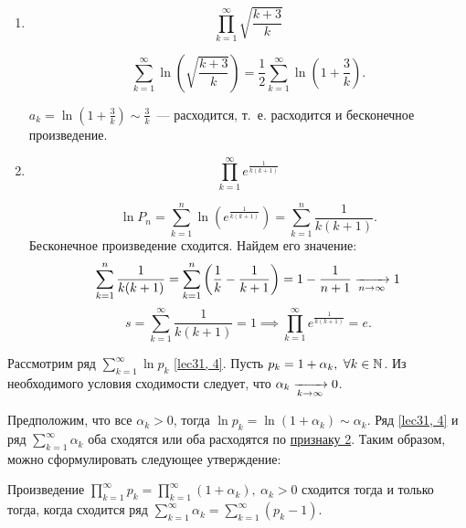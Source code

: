 \documentclass[../../main.tex]{subfiles}
\begin{document}
	\begin{example}
		\begin{enumerate}[label=\arabic*)]
			\item \[\prod\limits_{k = 1}^{\infty} \sqrt{\frac{k + 3}{k}}\]
			
			\[\sum\limits_{k = 1}^{\infty} \ln \left(\sqrt{\frac{k + 3}{k}}\right) = \frac{1}{2} 
			\sum\limits_{k = 1}^{\infty} \ln\left(1 + \frac{3}{k}\right). \]
			
			$\displaystyle a_k = \ln \left(1 + \frac{3}{k}\right) \sim \frac{3}{k}$~--- расходится, 
			т.~е. расходится и бесконечное произведение.
			
			\item \[\prod\limits_{k = 1}^{\infty} e^{\frac{1}{k(k + 1)}} \]
			
			\[\ln P_n = \sum\limits_{k = 1}^{n} \ln \left(e^{\frac{1}{k(k + 1)}}\right) 
			= \sum\limits_{k = 1}^{n} \frac{1}{k(k + 1)}.\]
			Бесконечное произведение сходится. Найдем его значение:
			\[\sum\limits_{k = 1}^{n} \frac{1}{k(k + 1)} = \sum\limits_{k = 1}^{n} 
			\left(\frac{1}{k} - \frac{1}{k + 1} \right) = 1 - \frac{1}{n + 1} \xrightarrow[n 
			\to \infty]{} 1 \]
			\[s = \sum\limits_{k = 1}^{\infty} \frac{1}{k(k + 1)} = 1 \implies 
			\prod\limits_{k = 1}^{\infty} e^{\frac{1}{k(k + 1)}} = e.\]
		\end{enumerate}
	\end{example}

	Рассмотрим ряд $\sum\limits_{k = 1}^{\infty} \ln p_k$ \eqref{lec31, 4}. Пусть 
	$p_k = 1 + \alpha_k,\ \forall k\in\mathbb{N}$. Из необходимого условия сходимости следует, 
	что $\alpha_k \xrightarrow[k \to \infty]{} 0$.
	
	Предположим, что все $\alpha_k > 0$, 
	тогда ${\ln p_k = \ln (1 + \alpha_k) \sim \alpha_k}$.
	Ряд \eqref{lec31, 4} и ряд $\sum\limits_{k = 1}^{\infty} \alpha_k$ оба 
	сходятся или оба расходятся по \hyperref[lec26:comp_test_2]{признаку 
	2\textdegree}. Таким образом, можно сформулировать
	следующее утверждение:
	
	\begin{thm}\label{lec31:thm2} 
		Произведение $\prod\limits_{k = 1}^{\infty} p_k = \prod\limits_{k = 
		1}^{\infty}(1 + \alpha_k),\ \alpha_k > 0$ сходится тогда и только тогда, 
		когда сходится ряд $\sum\limits_{k = 1}^{\infty} \alpha_k = \sum\limits_{k = 
		1}^{\infty} (p_k - 1)$.
	\end{thm}
\end{document}
